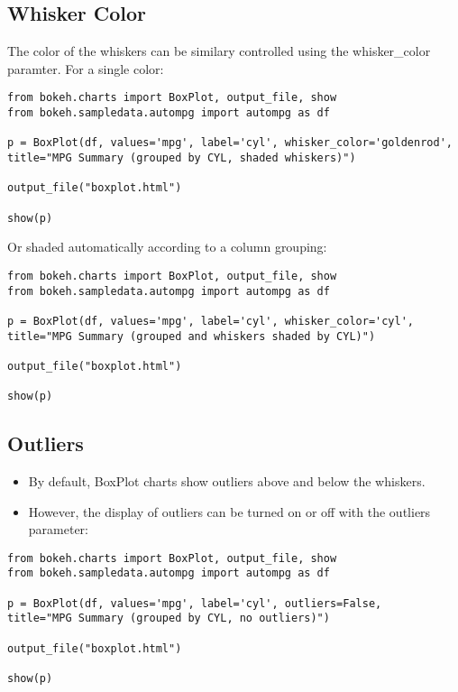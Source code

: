 \subsection{Whisker Color}
The color of the whiskers can be similary controlled using the whisker_color paramter. For a single color:
\begin{framed}
\begin{verbatim}
from bokeh.charts import BoxPlot, output_file, show
from bokeh.sampledata.autompg import autompg as df

p = BoxPlot(df, values='mpg', label='cyl', whisker_color='goldenrod',
title="MPG Summary (grouped by CYL, shaded whiskers)")

output_file("boxplot.html")

show(p)
\end{verbatim}
\end{framed}
Or shaded automatically according to a column grouping:

\begin{framed}
\begin{verbatim}
from bokeh.charts import BoxPlot, output_file, show
from bokeh.sampledata.autompg import autompg as df

p = BoxPlot(df, values='mpg', label='cyl', whisker_color='cyl',
title="MPG Summary (grouped and whiskers shaded by CYL)")

output_file("boxplot.html")

show(p)
\end{verbatim}
\end{framed}
\subsection{Outliers}
\begin{itemize}
\item By default, BoxPlot charts show outliers above and below the whiskers. 
\item However, the display of outliers can be turned on or off with the outliers parameter:
\end{itemize}


\begin{verbatim}
from bokeh.charts import BoxPlot, output_file, show
from bokeh.sampledata.autompg import autompg as df

p = BoxPlot(df, values='mpg', label='cyl', outliers=False,
title="MPG Summary (grouped by CYL, no outliers)")

output_file("boxplot.html")

show(p)
\end{verbatim}



